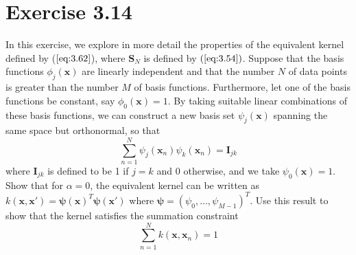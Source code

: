 \section*{Exercise 3.14}
In this exercise, we explore in more detail the properties of the equivalent
kernel defined by ($\ref{eq:3.62}$), where $\mathbf{S}_N$ is defined by 
$(\ref{eq:3.54})$. Suppose that the basis functions $\phi_j(\mathbf{x})$ are
linearly independent and that the number $N$ of data points is greater
than the number $M$ of basis functions. Furthermore, let one of the basis
functions be constant, say $\phi_0(\mathbf{x}) = 1$. By taking suitable
linear combinations of these basis functions, we can construct a new
basis set $\psi_j(\mathbf{x})$ spanning the same space but orthonormal,
so that 
\begin{equation}\label{eq:3.115}\tag{3.115}
    \sum_{n=1}^{N} \psi_j(\mathbf{x}_n)\psi_k(\mathbf{x}_n) = \mathbf{I}_{jk}
\end{equation}
where $\mathbf{I}_{jk}$ is defined to be 1 if $j = k$ and 0 otherwise,
and we take $\psi_0(\mathbf{x}) = 1$. Show that for $\alpha = 0$,
the equivalent kernel can be written as 
$k(\mathbf{x}, \mathbf{x'}) = \bm{\psi}(\mathbf{x})^T\bm{\psi}(\mathbf{x'})$ 
where $\bm{\psi} = (\psi_0, \ldots, \psi_{M - 1})^T$. Use this result
to show that the kernel satisfies the summation constraint
\begin{equation}\label{eq:3.116}\tag{3.116}
    \sum_{n=1}^{N} k(\mathbf{x}, \mathbf{x}_n) = 1
\end{equation}

\vspace{1em}

